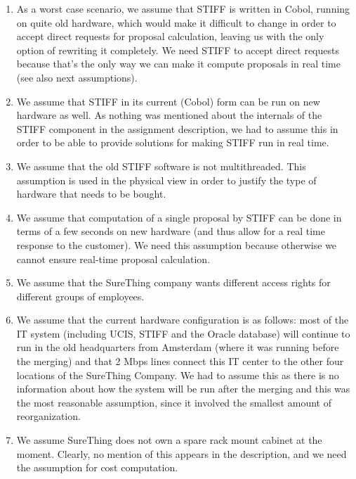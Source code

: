 \begin{enumerate}
\item As a worst case scenario, we assume that STIFF is written in Cobol, running on
quite old hardware, which would make it difficult to change in order to accept direct
requests for proposal calculation, leaving us with the only option of rewriting it
completely. We need STIFF to accept direct requests because that's the only way we
can make it compute proposals in real time (see also next assumptions).

\item We assume that STIFF in its current (Cobol) form can be run on new hardware
as well. As nothing was mentioned about the internals of the STIFF component in the
assignment description, we had to assume this in order to be able to provide solutions
for making STIFF run in real time.

\item We assume that the old STIFF software is not multithreaded. This assumption
is used in the physical view in order to justify the type of hardware that needs to be
bought.

\item We assume that computation of a single proposal by STIFF can be done in terms
of a few seconds on new hardware (and thus allow for a real time response to the customer).
We need this assumption because otherwise we cannot ensure real-time proposal calculation.

\item We assume that the SureThing company wants different access rights for different
groups of employees.

\item We assume that the current hardware configuration is as follows: most of the IT system
(including UCIS, STIFF and the Oracle database) will continue to run in the old headquarters from
Amsterdam (where it was running before the merging) and that 2 Mbps lines connect this IT
center to the other four locations of the SureThing Company. We had to assume this as there
is no information about how the system will be run after the merging and this was the most
reasonable assumption, since it involved the smallest amount of reorganization.

\item We assume SureThing does not own a spare rack mount cabinet at the moment. Clearly,
no mention of this appears in the description, and we need the assumption for cost computation.

\end{enumerate}


